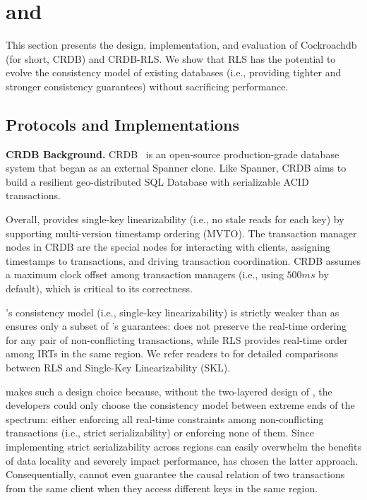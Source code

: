 \section{\crdb and \crdbxx}\label{sec:crdb}
This section presents the design, implementation, and evaluation of Cockroachdb (for short, CRDB) and CRDB-RLS. We show that RLS has the potential to evolve the consistency model of existing databases (i.e., providing tighter and stronger consistency guarantees) without sacrificing performance. 

\subsection{Protocols and Implementations}

\noindent\textbf{CRDB Background.} CRDB~\cite{taft2020cockroachdb} is an open-source production-grade database system that began as an external Spanner clone. Like Spanner, CRDB aims to build a resilient geo-distributed SQL Database with serializable ACID transactions.

Overall, \crdb provides single-key linearizability (i.e., no stale reads for each key) by supporting multi-version timestamp ordering (MVTO). The transaction manager nodes in CRDB are the special nodes for interacting with clients, assigning timestamps to transactions, and driving transaction coordination. CRDB assumes a maximum clock offset among transaction managers (i.e., using $500ms$ by default), which is critical to its correctness.

\crdb's consistency model (i.e., single-key linearizability) is strictly weaker than \xxcons as \crdb ensures only a subset of \xxcons's guarantees: \crdb does not preserve the real-time ordering for any pair of non-conflicting transactions, while RLS provides real-time order among IRTs in the same region. We refer readers to  for detailed comparisons between RLS and Single-Key Linearizability (SKL). 



\crdb makes such a design choice because, without the two-layered design of \xxcons, the developers could only choose the consistency model between extreme ends of the spectrum: either enforcing all real-time constraints among non-conflicting transactions (i.e., strict serializability) or enforcing none of them. Since implementing strict serializability across regions can easily overwhelm the benefits of data locality and severely impact performance, \crdb has chosen the latter approach. Consequentially, \crdb cannot even guarantee the causal relation of two transactions from the same client when they access different keys in the same region.


